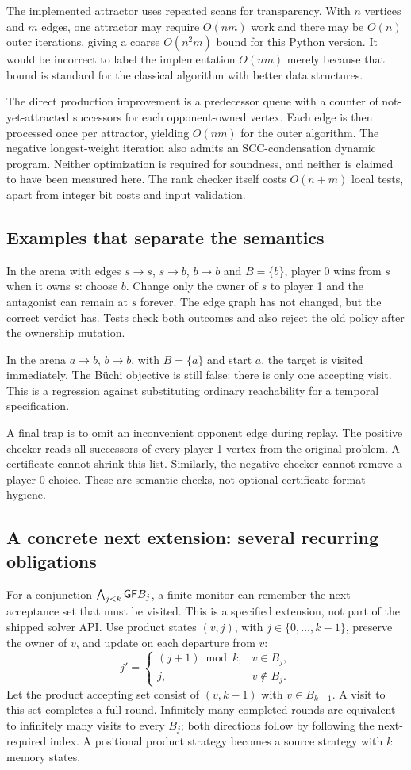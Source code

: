 The implemented attractor uses repeated scans for transparency. With $n$
vertices and $m$ edges, one attractor may require $O(nm)$ work and there may be
$O(n)$ outer iterations, giving a coarse $O(n^2m)$ bound for this Python
version. It would be incorrect to label the implementation $O(nm)$ merely
because that bound is standard for the classical algorithm with better data
structures.

The direct production improvement is a predecessor queue with a counter of
not-yet-attracted successors for each opponent-owned vertex. Each edge is then
processed once per attractor, yielding $O(nm)$ for the outer algorithm. The
negative longest-weight iteration also admits an SCC-condensation dynamic
program. Neither optimization is required for soundness, and neither is
claimed to have been measured here. The rank checker itself costs $O(n+m)$
local tests, apart from integer bit costs and input validation.

\subsection{Examples that separate the semantics}
In the arena with edges $s\to s$, $s\to b$, $b\to b$ and $B=\{b\}$,
player 0 wins from $s$ when it owns $s$: choose $b$. Change only the owner of
$s$ to player 1 and the antagonist can remain at $s$ forever. The edge graph
has not changed, but the correct verdict has. Tests check both outcomes and
also reject the old policy after the ownership mutation.

In the arena $a\to b$, $b\to b$, with $B=\{a\}$ and start $a$, the target is
visited immediately. The B\"uchi objective is still false: there is only one
accepting visit. This is a regression against substituting ordinary
reachability for a temporal specification.

A final trap is to omit an inconvenient opponent edge during replay. The
positive checker reads all successors of every player-1 vertex from the
original problem. A certificate cannot shrink this list. Similarly, the
negative checker cannot remove a player-0 choice. These are semantic checks,
not optional certificate-format hygiene.

\subsection{A concrete next extension: several recurring obligations}
For a conjunction $\bigwedge_{j<k}\mathsf{GF} B_j$, a finite monitor can remember the
next acceptance set that must be visited. This is a specified extension, not
part of the shipped solver API. Use product states $(v,j)$, with $j\in\{0,
\ldots,k-1\}$, preserve the owner of $v$, and update on each departure from $v$:
\[
 j'=\begin{cases}(j+1)\bmod k,&v\in B_j,\\j,&v\notin B_j.\end{cases}
\]
Let the product accepting set consist of $(v,k-1)$ with $v\in B_{k-1}$.
A visit to this set completes a full round. Infinitely many completed rounds
are equivalent to infinitely many visits to every $B_j$; both directions follow
by following the next-required index. A positional product strategy becomes a
source strategy with $k$ memory states.

